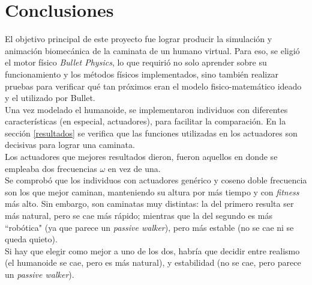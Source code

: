 \documentclass{article}
\begin{document}
\section{Conclusiones}
El objetivo principal de este proyecto fue lograr producir la simulaci\'on y animaci\'on biomec\'anica de la caminata de un humano virtual. Para eso, se eligi\'o el motor f\'isico \textit{Bullet Physics}, lo que requiri\'o no solo aprender sobre su funcionamiento y los m\'etodos f\'isicos implementados, sino tambi\'en realizar pruebas para verificar qu\'e tan pr\'oximos eran el modelo fisico-matem\'atico ideado y el utilizado por Bullet.\\ %
Una vez modelado el humanoide, se implementaron individuos con diferentes caracter\'isticas (en especial, actuadores), para facilitar la comparaci\'on. En la secci\'on \ref{resultados} se verifica que las funciones utilizadas en los actuadores son decisivas para lograr una caminata.\\
Los actuadores que mejores resultados dieron, fueron aquellos en donde se empleaba dos frecuencias $\omega$ en vez de una.\\
Se comprob\'o que los individuos con actuadores gen\'erico y coseno doble frecuencia son los que mejor caminan, manteniendo su altura por m\'as tiempo y con \textit{fitness} m\'as alto. Sin embargo, son caminatas muy distintas: la del primero resulta ser m\'as natural, pero se cae m\'as r\'apido; mientras que la del segundo es m\'as ``rob\'otica" (ya que parece un \textit{passive walker}), pero m\'as estable (no se cae ni se queda quieto).\\
Si hay que elegir como mejor a uno de los dos, habr\'ia que decidir entre realismo (el humanoide se cae, pero es m\'as natural), y estabilidad (no se cae, pero parece un \textit{passive walker}).\\
\end{document}
